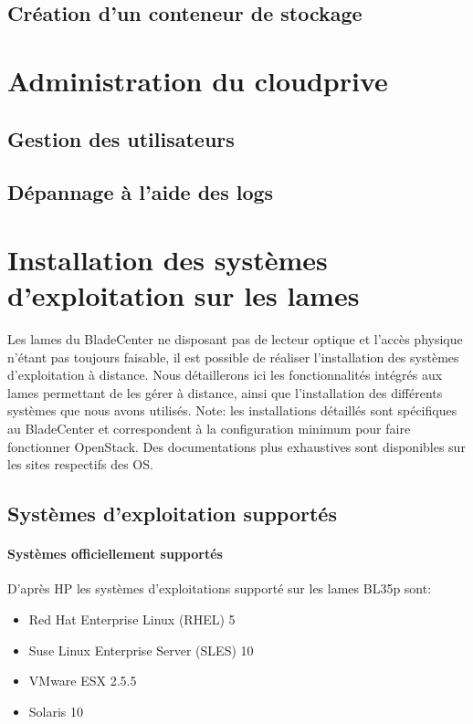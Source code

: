 \documentclass[a4paper,oneside]{report}
\begin{document}
\section{Création d'un conteneur de stockage}

\chapter{Administration du \gls{cloudprive}}

\section{Gestion des utilisateurs}

\section{Dépannage à l'aide des logs} 


\chapter{Installation des systèmes d'exploitation sur les lames} \label{sec:installos}
Les lames du BladeCenter ne disposant pas de lecteur optique et l'accès physique n'étant pas toujours faisable, il est possible de réaliser l'installation des systèmes d'exploitation à distance.
Nous détaillerons ici les fonctionnalités intégrés aux lames permettant de les gérer à distance, ainsi que l'installation des différents systèmes que nous avons utilisés.\newline
Note: les installations détaillés sont spécifiques au BladeCenter et correspondent à la configuration minimum pour faire fonctionner OpenStack. Des documentations plus exhaustives sont disponibles sur les sites respectifs des OS.

\section{Systèmes d'exploitation supportés}
\subsubsection{Systèmes officiellement supportés}
D'après HP les systèmes d'exploitations supporté sur les lames BL35p sont:
\begin{itemize}
\item Red Hat Enterprise Linux (RHEL) 5
\item Suse Linux Enterprise Server (SLES) 10
\item VMware ESX 2.5.5
\item Solaris 10
\end{itemize}
\end{document}
